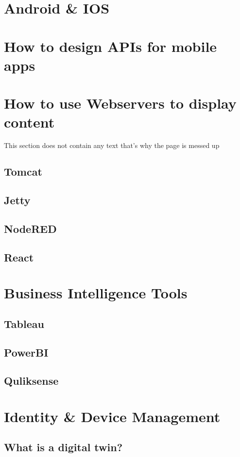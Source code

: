 \documentclass[12pt, numbers=noenddot]{scrreprt} %
\begin{document}
\section{Android \& IOS }
\section{How to design APIs for mobile apps}

\section{How to use Webservers to display content}
This section does not contain any text that's why the page is messed up
\subsection{Tomcat}
\subsection{Jetty}
\subsection{NodeRED}
\subsection{React}

\section{Business Intelligence Tools}
\subsection{Tableau}
\subsection{PowerBI}
\subsection{Quliksense}

\section{Identity \& Device Management}

\subsection{What is a digital twin?}
\end{document}
